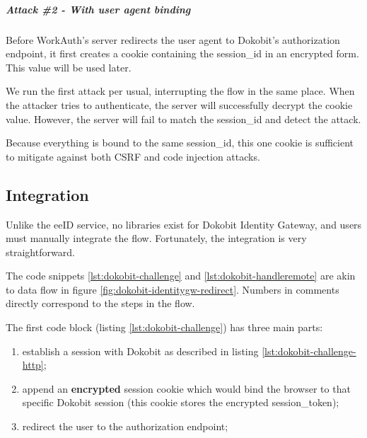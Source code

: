 \subparagraph{Attack \#2 - With user agent binding}

Before WorkAuth's server redirects the user agent to Dokobit's authorization endpoint, it first creates a cookie containing the session\_id in an encrypted form. This value will be used later.

We run the first attack per usual, interrupting the flow in the same place. When the attacker tries to authenticate, the server will successfully decrypt the cookie value. However, the server will fail to match the session\_id and detect the attack.

Because everything is bound to the same session\_id, this one cookie is sufficient to mitigate against both CSRF and code injection attacks.

\subsection{Integration}

Unlike the eeID service, no libraries exist for Dokobit Identity Gateway, and users must manually integrate the flow. Fortunately, the integration is very straightforward.

The code snippets \ref{lst:dokobit-challenge} and \ref{lst:dokobit-handleremote} are akin to data flow in figure \ref{fig:dokobit-identitygw-redirect}. Numbers in comments directly correspond to the steps in the flow.

The first code block (listing \ref{lst:dokobit-challenge}) has three main parts:

\begin{enumerate}
  \item establish a session with Dokobit as described in listing \ref{lst:dokobit-challenge-http};
  \item append an \textbf{encrypted} session cookie which would bind the browser to that specific Dokobit session (this cookie stores the encrypted session\_token);
  \item redirect the user to the authorization endpoint;
\end{enumerate}

